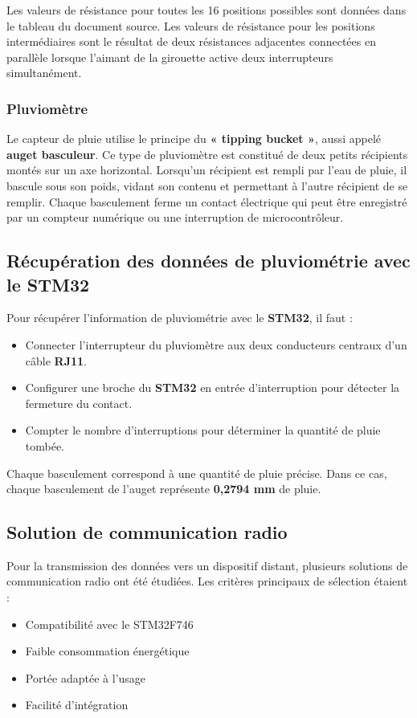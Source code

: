 \documentclass[12pt]{article}
\begin{document}
Les valeurs de résistance pour toutes les 16 positions possibles sont données dans le tableau du document source. Les valeurs de résistance pour les positions intermédiaires sont le résultat de deux résistances adjacentes connectées en parallèle lorsque l'aimant de la girouette active deux interrupteurs simultanément.

\subsubsection{Pluviomètre}
Le capteur de pluie utilise le principe du \textbf{« tipping bucket »}, aussi appelé \textbf{auget basculeur}. Ce type de pluviomètre est constitué de deux petits récipients montés sur un axe horizontal. Lorsqu'un récipient est rempli par l'eau de pluie, il bascule sous son poids, vidant son contenu et permettant à l'autre récipient de se remplir. Chaque basculement ferme un contact électrique qui peut être enregistré par un compteur numérique ou une interruption de microcontrôleur.

\subsection*{Récupération des données de pluviométrie avec le STM32}

Pour récupérer l'information de pluviométrie avec le \textbf{STM32}, il faut :
\begin{itemize}
    \item Connecter l'interrupteur du pluviomètre aux deux conducteurs centraux d'un câble \textbf{RJ11}.
    \item Configurer une broche du \textbf{STM32} en entrée d'interruption pour détecter la fermeture du contact.
    \item Compter le nombre d'interruptions pour déterminer la quantité de pluie tombée.
\end{itemize}

Chaque basculement correspond à une quantité de pluie précise. Dans ce cas, chaque basculement de l'auget représente \textbf{0,2794 mm} de pluie.

\subsection{Solution de communication radio}

Pour la transmission des données vers un dispositif distant, plusieurs solutions de communication radio ont été étudiées. Les critères principaux de sélection étaient :
\begin{itemize}
    \item Compatibilité avec le STM32F746
    \item Faible consommation énergétique
    \item Portée adaptée à l'usage
    \item Facilité d'intégration
\end{itemize}
\end{document}
